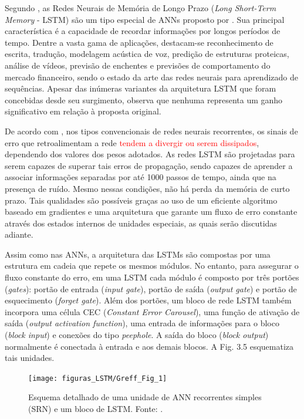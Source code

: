 Segundo , as Redes Neurais de Memória de Longo Prazo (\textit{Long Short-Term Memory} - LSTM) são um tipo especial de ANNs proposto por . Sua principal característica é a capacidade de recordar informações por longos períodos de tempo. Dentre a vasta gama de aplicações, destacam-se reconhecimento de escrita, tradução, modelagem acústica de voz, predição de estruturas proteicas, análise de vídeos, previsão de enchentes e previsões de comportamento do mercado financeiro, sendo o estado da arte das redes neurais para aprendizado de sequências. Apesar das inúmeras variantes da arquitetura LSTM que foram concebidas desde seu surgimento,  observa que nenhuma representa um ganho significativo em relação à proposta original.

De acordo com , nos tipos convencionais de redes neurais recorrentes, os sinais de erro que retroalimentam a rede \textcolor{red}{tendem a divergir ou serem dissipados}, dependendo dos valores dos pesos adotados. As redes LSTM são projetadas para serem capazes de superar tais erros de propagação, sendo capazes de aprender a associar informações separadas por até 1000 passos de tempo, ainda que na presença de ruído. Mesmo nessas condições, não há perda da memória de curto prazo. Tais qualidades são possíveis graças ao uso de um eficiente algoritmo baseado em gradientes e uma arquitetura que garante um fluxo de erro constante através dos estados internos de unidades especiais, as quais serão discutidas adiante.

Assim como nas ANNs, a arquitetura das LSTMs são compostas por uma estrutura em cadeia que repete os mesmos módulos. No entanto, para assegurar o fluxo constante do erro, em uma LSTM cada módulo é composto por três portões (\textit{gates}): portão de entrada (\textit{input gate}), portão de saída (\textit{output gate}) e portão de esquecimento (\textit{forget gate}).  Além dos portões, um bloco de rede LSTM também incorpora uma célula CEC (\textit{Constant Error Carousel}), uma função de ativação de saída (\textit{output activation function}), uma entrada de informações para o bloco (\textit{block input}) e conexões do tipo \textit{peephole}. A saída do bloco (\textit{block output}) normalmente é conectada à entrada e aos demais blocos. A Fig. 3.5 esquematiza tais unidades.

\begin{figure}[H]
	{\centering}
	{\texttt{[image: figuras\_LSTM/Greff\_Fig\_1]}}
	{\caption{Esquema detalhado de uma unidade de ANN recorrentes simples (SRN) e um bloco de LSTM. Fonte: .}}
	{\label{fig:lstmcell}}
\end{figure}

